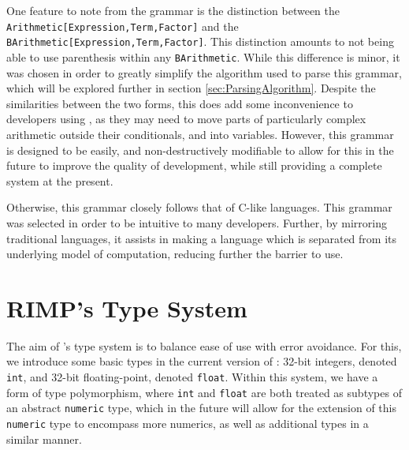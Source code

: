 One feature to note from the grammar is the distinction between the \\\lstinline{Arithmetic[Expression,Term,Factor]} and the \lstinline{BArithmetic[Expression,Term,Factor]}.
This distinction amounts to not being able to use parenthesis within any \lstinline{BArithmetic}. While this difference is minor, it was chosen in order to greatly simplify the algorithm used to parse this grammar, which will be explored further in section \ref{sec:ParsingAlgorithm}.
Despite the similarities between the two forms, this does add some inconvenience to developers using \rimp, as they may need to move parts of particularly complex arithmetic outside their conditionals, and into variables. However, this grammar is designed to be easily, and non-destructively modifiable to allow for this in the future to improve the quality of development, while still providing a complete system at the present.

Otherwise, this grammar closely follows that of C-like languages. This grammar was selected in order to be intuitive to many developers. Further, by mirroring traditional languages, it assists in making \rimplang a language which is separated from its underlying model of computation, reducing further the barrier to use.

\section{RIMP's Type System}

The aim of \rimp's type system is to balance ease of use with error avoidance. For this, we introduce some basic types in the current version of \rimp: 32-bit integers, denoted \lstinline{int}, and 32-bit floating-point, denoted \lstinline{float}. Within this system, we have a form of type polymorphism, where \lstinline{int} and \lstinline{float} are both treated as subtypes of an abstract \lstinline{numeric} type, which in the future will allow for the extension of this \lstinline{numeric} type to encompass more numerics, as well as additional types in a similar manner.

